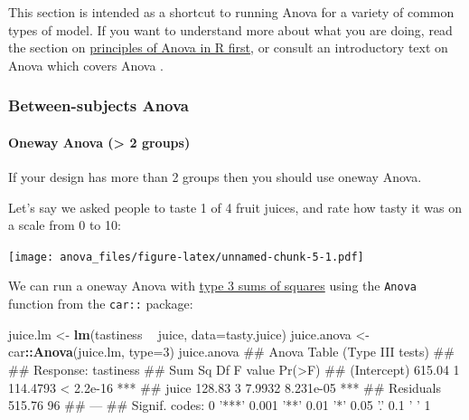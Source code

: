 \documentclass[]{article}
\newenvironment{Shaded}{\begin{snugshade}}{\end{snugshade}}
\newcommand{\KeywordTok}[1]{\textcolor[rgb]{0.13,0.29,0.53}{\textbf{#1}}}
\newcommand{\DataTypeTok}[1]{\textcolor[rgb]{0.13,0.29,0.53}{#1}}
\newcommand{\DecValTok}[1]{\textcolor[rgb]{0.00,0.00,0.81}{#1}}
\newcommand{\StringTok}[1]{\textcolor[rgb]{0.31,0.60,0.02}{#1}}
\newcommand{\OperatorTok}[1]{\textcolor[rgb]{0.81,0.36,0.00}{\textbf{#1}}}
\newcommand{\NormalTok}[1]{#1}
\let\oldparagraph\paragraph
\renewcommand{\paragraph}[1]{\oldparagraph{#1}\mbox{}}
\theoremstyle{definition}
\theoremstyle{definition}
\theoremstyle{definition}
\theoremstyle{remark}
\begin{document}
This section is intended as a shortcut to running Anova for a variety of
common types of model. If you want to understand more about what you are
doing, read the section on \protect\hyperlink{anova}{principles of Anova
in R first}, or consult an introductory text on Anova which covers Anova
\citep[e.g.][]{howell2012statistical}.

\subsubsection*{Between-subjects Anova}\label{between-subjects-anova}

\paragraph{Oneway Anova (\textgreater{} 2 groups)}\label{oneway-anova}

If your design has more than 2 groups then you should use oneway Anova.

Let's say we asked people to taste 1 of 4 fruit juices, and rate how
tasty it was on a scale from 0 to 10:

\texttt{[image: anova\_files/figure-latex/unnamed-chunk-5-1.pdf]}

We can run a oneway Anova with \protect\hyperlink{sums-squares}{type 3
sums of squares} using the \texttt{Anova} function from the
\texttt{car::} package:

\begin{Shaded}
\begin{Highlighting}[]
\NormalTok{juice.lm <-}\StringTok{ }\KeywordTok{lm}\NormalTok{(tastiness }\OperatorTok{~}\StringTok{ }\NormalTok{juice, }\DataTypeTok{data=}\NormalTok{tasty.juice)}
\NormalTok{juice.anova <-}\StringTok{ }\NormalTok{car}\OperatorTok{::}\KeywordTok{Anova}\NormalTok{(juice.lm, }\DataTypeTok{type=}\DecValTok{3}\NormalTok{)}
\NormalTok{juice.anova}
\NormalTok{## Anova Table (Type III tests)}
\NormalTok{## }
\NormalTok{## Response: tastiness}
\NormalTok{##             Sum Sq Df  F value    Pr(>F)    }
\NormalTok{## (Intercept) 615.04  1 114.4793 < 2.2e-16 ***}
\NormalTok{## juice       128.83  3   7.9932 8.231e-05 ***}
\NormalTok{## Residuals   515.76 96                       }
\NormalTok{## ---}
\NormalTok{## Signif. codes:  0 '***' 0.001 '**' 0.01 '*' 0.05 '.' 0.1 ' ' 1}
\end{Highlighting}
\end{Shaded}
\end{document}
